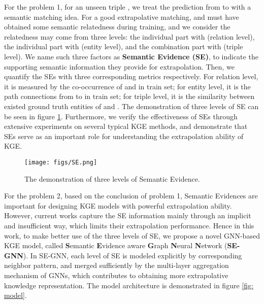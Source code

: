 \documentclass[letterpaper]{article} \usepackage{aaai22}  \usepackage{times}  \usepackage{helvet}  \usepackage{courier}  \usepackage[hyphens]{url}  \usepackage{graphicx} \urlstyle{rm} \def\UrlFont{\rm}  \usepackage{natbib}  \usepackage{caption} \DeclareCaptionStyle{ruled}{labelfont=normalfont,labelsep=colon,strut=off} \frenchspacing  \setlength{\pdfpagewidth}{8.5in}  \setlength{\pdfpageheight}{11in}  \usepackage{algorithm}
\begin{document}
For the problem 1, for an unseen triple , we treat the prediction from  to  with a semantic matching idea. For a good extrapolative matching,  and  must have obtained some semantic relatedness during training, and we consider the relatedness may come from three levels: the individual  part with  (relation level), the individual  part with  (entity level), and the combination  part with  (triple level). 
We name such three factors as \textbf{Semantic Evidence (SE)}, to indicate the supporting semantic information they provide for extrapolation. Then, we quantify the SEs with three corresponding metrics respectively. 
For relation level, it is measured by the co-occurrence of  and  in train set; for entity level, it is the path connections from  to  in train set; for triple level, it is the similarity between existed ground truth entities of  and . The demonstration of three levels of SE can be seen in figure \ref{fig: SE}. 
Furthermore, we verify the effectiveness of SEs through extensive experiments on several typical KGE methods, and demonstrate that SEs serve as an important role for understanding the extrapolation ability of KGE.

\begin{figure}[t]
    \centering 
    \texttt{[image: figs/SE.png]}
    \caption{The demonstration of three levels of Semantic Evidence.} 
    \label{fig: SE} 
\end{figure}

For the problem 2, based on the conclusion of problem 1, Semantic Evidences are important for designing KGE models with powerful extrapolation ability. However, current works capture the SE information mainly through an implicit and insufficient way, which limits their extrapolation performance. 
Hence in this work, to make better use of the three levels of SE, we propose a novel GNN-based KGE model, called \textbf{S}emantic \textbf{E}vidence aware \textbf{G}raph \textbf{N}eural \textbf{N}etwork (\textbf{SE-GNN}). In SE-GNN, each level of SE is modeled explicitly by corresponding neighbor pattern, and merged sufficiently by the multi-layer aggregation mechanism of GNNs, which contributes to obtaining more extrapolative knowledge representation. The model architecture is demonstrated in figure \ref{fig: model}.
\end{document}
